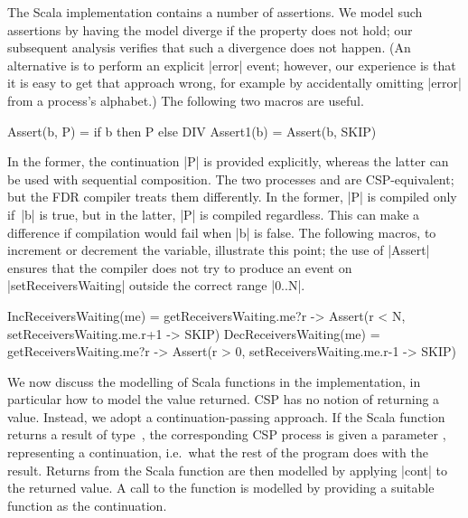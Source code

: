 The Scala implementation contains a number of assertions.  We model such
assertions by having the model diverge if the property does not hold; our
subsequent analysis verifies that such a divergence does not happen.  (An
alternative is to perform an explicit |error| event; however, our experience
is that it is easy to get that approach wrong, for example by accidentally
omitting |error| from a process's alphabet.)  The following two macros are
useful.
%
\begin{cspm}
Assert(b, P) = if b then P else DIV
Assert1(b) = Assert(b, SKIP)
\end{cspm}
%
In the former, the continuation |P| is provided explicitly, whereas the latter
can be used with sequential composition.  The two processes  and  are CSP-equivalent; but the FDR compiler treats
them differently.  In the former, |P| is compiled only if~|b| is true, but in
the latter, |P| is compiled regardless.  This can make a difference if
compilation would fail when |b| is false.  The following macros, to increment
or decrement the  variable, illustrate this point; the
use of |Assert| ensures that the compiler does not try to produce an event on
|setReceiversWaiting| outside the correct range |{0..N}|.
%
\begin{cspm}
IncReceiversWaiting(me) = 
  getReceiversWaiting.me?r -> Assert(r < N, setReceiversWaiting.me.r+1 -> SKIP)
DecReceiversWaiting(me) =
  getReceiversWaiting.me?r -> Assert(r > 0, setReceiversWaiting.me.r-1 -> SKIP)
\end{cspm}

We now discuss the modelling of Scala functions in the implementation, in
particular how to model the value returned.  CSP has no notion of returning a
value.  Instead, we adopt a continuation-passing approach.  If the Scala
function returns a result of type~, the corresponding CSP process is
given a parameter ,  representing a continuation,
i.e.~what the rest of the program does with the result.  Returns from the
Scala function are then modelled by applying |cont| to the returned value.  A
call to the function is modelled by providing a suitable function as the
continuation.

